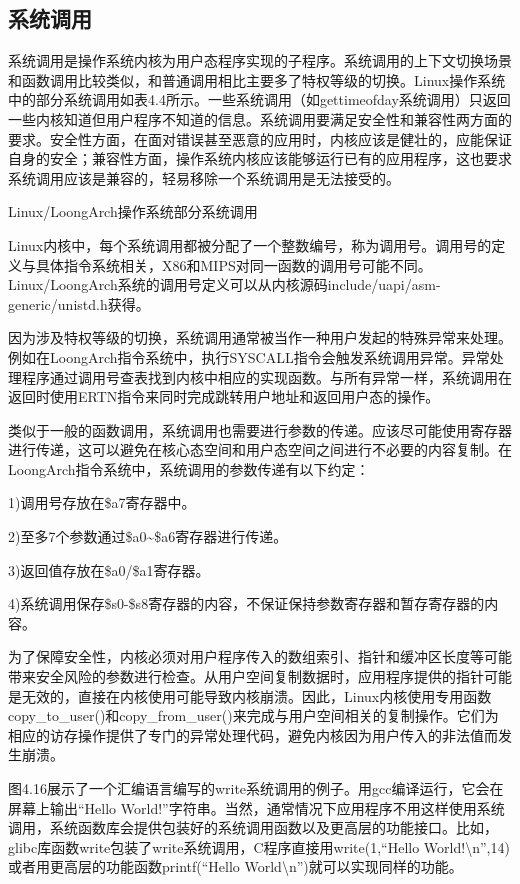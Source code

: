 \documentclass[]{ctexbook}
\begin{document}
\hypertarget{ux7cfbux7edfux8c03ux7528}{%
\subsection{系统调用}\label{ux7cfbux7edfux8c03ux7528}}

系统调用是操作系统内核为用户态程序实现的子程序。系统调用的上下文切换场景和函数调用比较类似，和普通调用相比主要多了特权等级的切换。Linux操作系统中的部分系统调用如表4.4所示。一些系统调用（如gettimeofday系统调用）只返回一些内核知道但用户程序不知道的信息。系统调用要满足安全性和兼容性两方面的要求。安全性方面，在面对错误甚至恶意的应用时，内核应该是健壮的，应能保证自身的安全；兼容性方面，操作系统内核应该能够运行已有的应用程序，这也要求系统调用应该是兼容的，轻易移除一个系统调用是无法接受的。

\label{tab:syscall}Linux/LoongArch操作系统部分系统调用

Linux内核中，每个系统调用都被分配了一个整数编号，称为调用号。调用号的定义与具体指令系统相关，X86和MIPS对同一函数的调用号可能不同。Linux/LoongArch系统的调用号定义可以从内核源码include/uapi/asm-generic/unistd.h获得。

因为涉及特权等级的切换，系统调用通常被当作一种用户发起的特殊异常来处理。例如在LoongArch指令系统中，执行SYSCALL指令会触发系统调用异常。异常处理程序通过调用号查表找到内核中相应的实现函数。与所有异常一样，系统调用在返回时使用ERTN指令来同时完成跳转用户地址和返回用户态的操作。

类似于一般的函数调用，系统调用也需要进行参数的传递。应该尽可能使用寄存器进行传递，这可以避免在核心态空间和用户态空间之间进行不必要的内容复制。在LoongArch指令系统中，系统调用的参数传递有以下约定：

1)调用号存放在\$a7寄存器中。

2)至多7个参数通过\$a0\textasciitilde\$a6寄存器进行传递。

3)返回值存放在\$a0/\$a1寄存器。

4)系统调用保存\$s0-\$s8寄存器的内容，不保证保持参数寄存器和暂存寄存器的内容。

为了保障安全性，内核必须对用户程序传入的数组索引、指针和缓冲区长度等可能带来安全风险的参数进行检查。从用户空间复制数据时，应用程序提供的指针可能是无效的，直接在内核使用可能导致内核崩溃。因此，Linux内核使用专用函数copy\_to\_user()和copy\_from\_user()来完成与用户空间相关的复制操作。它们为相应的访存操作提供了专门的异常处理代码，避免内核因为用户传入的非法值而发生崩溃。

图4.16展示了一个汇编语言编写的write系统调用的例子。用gcc编译运行，它会在屏幕上输出``Hello World!''字符串。当然，通常情况下应用程序不用这样使用系统调用，系统函数库会提供包装好的系统调用函数以及更高层的功能接口。比如，glibc库函数write包装了write系统调用，C程序直接用write(1,``Hello World!\textbackslash n'',14)或者用更高层的功能函数printf(``Hello World\textbackslash n'')就可以实现同样的功能。
\end{document}
